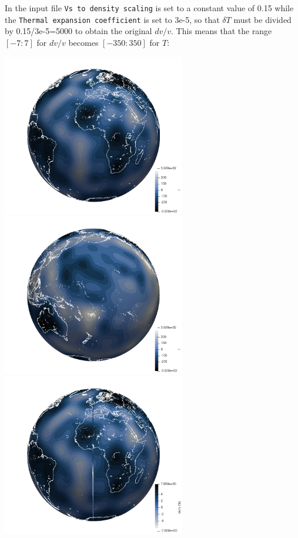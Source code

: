 In the input file \texttt{Vs to density scaling} is set to a constant value of 0.15 while 
the \texttt{Thermal expansion coefficient} is set to 3e-5, so that $\delta T$ must be 
divided by 0.15/3e-5=5000 to obtain the original $dv/v$. This means that the 
range $[-7:7]$ for $dv/v$ becomes $[-350:350]$ for $T$:

\begin{center}
\includegraphics[width=8cm]{python_codes/fieldstone_85/aspect/aspect1}
\includegraphics[width=8cm]{python_codes/fieldstone_85/aspect/aspect2}\\
\includegraphics[width=8cm]{python_codes/fieldstone_85/aspect/fieldstone1}

\end{center}
